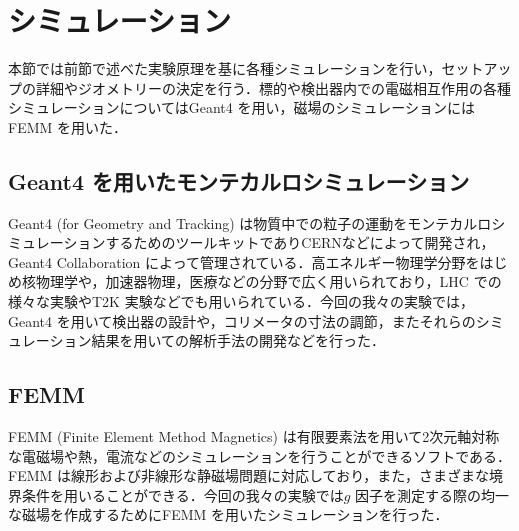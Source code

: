 \section{シミュレーション}
	本節では前節で述べた実験原理を基に各種シミュレーションを行い，セットアップの詳細やジオメトリーの決定を行う．標的や検出器内での電磁相互作用の各種シミュレーションについてはGeant4 を用い，磁場のシミュレーションにはFEMM を用いた．
	
	\subsection{Geant4 を用いたモンテカルロシミュレーション}
	Geant4 (for Geometry and Tracking) は物質中での粒子の運動をモンテカルロシミュレーションするためのツールキットでありCERNなどによって開発され，Geant4 Collaboration によって管理されている．高エネルギー物理学分野をはじめ核物理学や，加速器物理，医療などの分野で広く用いられており，LHC での様々な実験やT2K 実験などでも用いられている．今回の我々の実験では，Geant4 を用いて検出器の設計や，コリメータの寸法の調節，またそれらのシミュレーション結果を用いての解析手法の開発などを行った．%
	\subsection{FEMM}
		FEMM (Finite Element Method Magnetics) は有限要素法を用いて2次元軸対称な電磁場や熱，電流などのシミュレーションを行うことができるソフトである．FEMM は線形および非線形な静磁場問題に対応しており，また，さまざまな境界条件を用いることができる．今回の我々の実験では$g$ 因子を測定する際の均一な磁場を作成するためにFEMM を用いたシミュレーションを行った．


%
